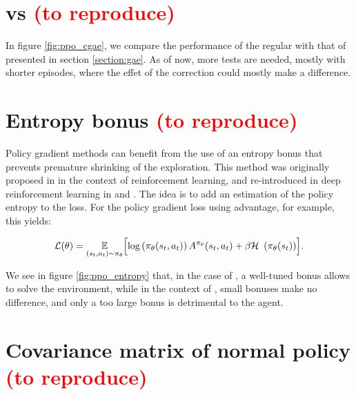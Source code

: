 \section{\gae vs \cgae \textcolor{red}{(to reproduce)}}

In figure \ref{fig:ppo_cgae}, we compare the performance of the regular \gae with that of \cgae presented in section \ref{section:gae}. As of now, more tests are needed, mostly with shorter episodes, where the effet of the \cgae correction could mostly make a difference.



\section{Entropy bonus \textcolor{red}{(to reproduce)}}

Policy gradient methods can benefit from the use of an entropy bonus that prevents premature shrinking of the exploration. This method was originally proposed in \cite{williams1991} in the context of reinforcement learning, and re-introduced in deep reinforcement learning in \cite{a2c} and \cite{ppo}. The idea is to add an estimation of the policy entropy to the loss. For the policy gradient loss using advantage, for example, this yields:

\begin{equation}
	\mathcal{L}(\theta) = \expect{(s_t, a_t) \sim \pi_\theta} \Bigl[ \log \left( \pi_\theta (s_t, a_t) \right) A^{\pi_\theta} (s_t, a_t) + \beta \entropy \left( \pi_\theta (s_t) \right) \Bigr].
\end{equation}

We see in figure \ref{fig:ppo_entropy} that, in the case of , a well-tuned bonus allows to solve the environment, while in the context of , small bonuses make no difference, and only a too large bonus is detrimental to the agent.



\section{Covariance matrix of normal policy \textcolor{red}{(to reproduce)}}

